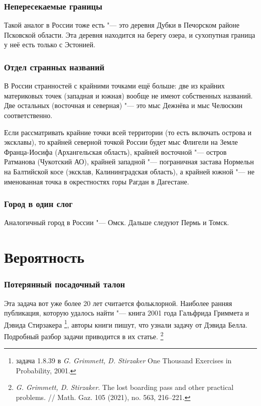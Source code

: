 \documentclass[twoside]{book}
\begin{document}
\subsubsection{Непересекаемые границы}
Такой аналог в России тоже есть "--- это деревня Дубки в Печорском  районе Псковской области.
Эта деревня находится на берегу озера, и сухопутная граница у неё есть только с Эстонией.

\subsubsection{Отдел странных названий}
В России странностей с крайними точками ещё больше: две из крайних материковых точек (западная и южная) 
вообще не имеют собственных названий. Две остальных (восточная и северная) "--- это мыс Дежнёва и мыс Челюскин
соответственно. 

Если рассматривать крайние точки всей территории (то есть включать острова и эксклавы), то крайней северной
точкой России будет мыс Флигели на Земле Франца-Иосифа (Архангельская область), крайней восточной "--- остров Ратманова (Чукотский АО), 
крайней западной "--- пограничная застава Нормельн на Балтийской косе (эксклав, Калининградская область), 
а крайней южной "--- не именованная точка в окрестностях горы Рагдан в Дагестане.

\subsubsection{Город в один слог}
Аналогичный город в России "--- Омск.
Дальше следуют Пермь и Томск.

\section{Вероятность}

\subsubsection{Потерянный посадочный талон}
Эта задача вот уже более 20 лет считается фольклорной.
Наиболее ранняя публикация, которую удалось найти "--- книга 2001 года Гальфрида Гриммета и Дэвида Стирзакера%
\footnote{задача 1.8.39 в \emph{G. Grimmett, D. Stirzaker} One Thousand Exercises in Probability, 2001.},
авторы книги пишут, что узнали задачу от Дэвида Белла.
Подробный разбор задачи приводится в их статье.%
\footnote{\emph{G. Grimmett, D. Stirzaker}.
The lost boarding pass and other practical problems.
/\!/
Math. Gaz. 105 (2021), no. 563, 216--221.}
\end{document}

